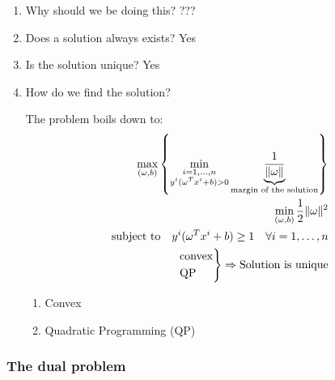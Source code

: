\begin{enumerate}
	\item Why should we be doing this? ???
	\item Does a solution always exists? Yes
	\item Is the solution unique? Yes
	\item How do we find the solution?

	      The problem boils down to:
	      \begin{align*}
		      \max_{(\omega, b)}
		      \left\{
		      \min_{\substack{i=1,\dots, n                                                  \\ y^i(\omega^Tx^i + b) > 0}}
		      \underbrace{\frac{1}{\lVert\omega\rVert}}_{\text{margin of the solution}}
		      \right\}                                                                      \\
		      \min_{(\omega, b)} \frac{1}{2}\lVert\omega\rVert^2                            \\
		      \text{subject to} \quad y^i(\omega^Tx^i + b) \geq 1 \quad \forall i=1,\dots,n \\
		      \begin{rcases*}
			      \text{convex} \\
			      \text{QP}     \\
		      \end{rcases*} \Rightarrow \text{Solution is unique}
	      \end{align*}

	      \begin{enumerate}
		      \item Convex
		      \item Quadratic Programming (QP)
	      \end{enumerate}

\end{enumerate}

\subsubsection{The dual problem}

